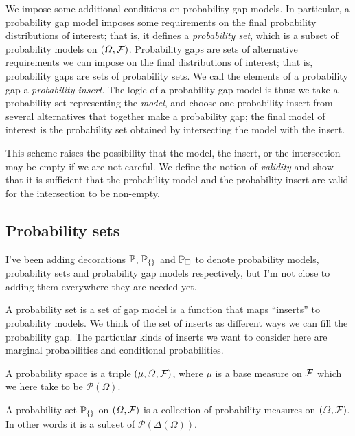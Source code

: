 We impose some additional conditions on probability gap models. In particular, a probability gap model imposes some requirements on the final probability distributions of interest; that is, it defines a \emph{probability set}, which is a subset of probability models on $(\Omega,\mathcal{F})$. Probability gaps are sets of alternative requirements we can impose on the final distributions of interest; that is, probability gaps are sets of probability sets. We call the elements of a probability gap a \emph{probability insert}. The logic of a probability gap model is thus: we take a probability set representing the \emph{model}, and choose one probability insert from several alternatives that together make a probability gap; the final model of interest is the probability set obtained by intersecting the model with the insert.

This scheme raises the possibility that the model, the insert, or the intersection may be empty if we are not careful. We define the notion of \emph{validity} and show that it is sufficient that the probability model and the probability insert are valid for the intersection to be non-empty.

\subsection{Probability sets}

I've been adding decorations $\mathbb{P}$, $\mathbb{P}_{\{\}}$ and $\mathbb{P}_{\square}$ to denote probability models, probability sets and probability gap models respectively, but I'm not close to adding them everywhere they are needed yet.

A probability set is a set of gap model is a function that maps ``inserts'' to probability models. We think of the set of inserts as different ways we can fill the probability gap. The particular kinds of inserts we want to consider here are marginal probabilities and conditional probabilities.

\begin{definition}
A probability space is a triple $(\mu,\Omega,\mathcal{F})$, where $\mu$ is a base measure on $\mathcal{F}$ which we here take to be $\mathscr{P}(\Omega)$.
\end{definition}

\begin{definition}
A probability set $\mathbb{P}_{\{\}}$ on $(\Omega,\mathcal{F})$ is a collection of probability measures on $(\Omega,\mathcal{F})$. In other words it is a subset of $\mathscr{P}(\Delta(\Omega))$.
\end{definition}

